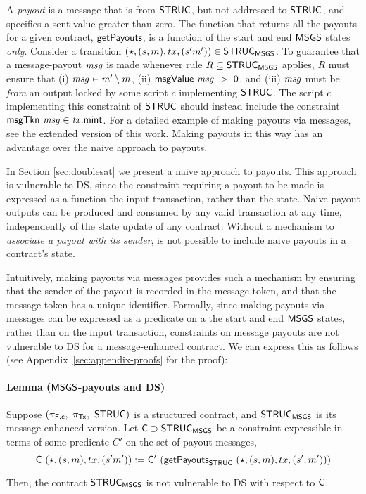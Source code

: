 A \emph{payout} is a message that is from $\mathsf{STRUC}$, but not addressed to $\mathsf{STRUC}$, and
specifies a sent value greater than zero. The function that
returns all the payouts for a given contract, $\mathsf{getPayouts}$, is a function
of the start and end $\mathsf{MSGS}$ states \emph{only}.
Consider a transition $(\star, (s, m), tx, (s' m')) \in \mathsf{STRUC}_{\mathsf{MSGS}}$.
To guarantee that a message-payout $\mathit{msg}$ is made whenever rule $R \subseteq \mathsf{STRUC}_{\mathsf{MSGS}}$
applies, $R$ must ensure that (i) $\mathit{msg} \in \mathit{m'} \setminus m$,
(ii) $\mathsf{msgValue}~\mathit{msg} ~>~ 0$, and (iii) $\mathit{msg}$ must be \emph{from} an output
locked by some script $c$ implementing $\mathsf{STRUC}$.
The script $c$ implementing this constraint of $\mathsf{STRUC}$ should
instead include the constraint $\mathsf{msgTkn}~\mathit{msg} \in \mathit{tx} . \mathsf{mint}$. For a detailed example
of making payouts via messages, see the extended version of this work.
Making payouts in this way has an advantage over the naive approach to payouts.

In Section \ref{sec:doublesat} we present a naive approach to payouts. This approach is
vulnerable to DS, since the constraint requiring a payout to be made is expressed
as a function the input transaction, rather than the state.
Naive payout outputs can be produced and consumed by any valid transaction at any time,
independently of the state update of any contract.
Without a mechanism to \emph{associate a payout with its sender}, is not possible to
include naive payouts in a contract's state.

Intuitively, making payouts via messages provides such a mechanism by ensuring that the
sender of the payout is recorded in the message token, and that the message token
has a unique identifier. Formally, since making payouts via messages can be expressed as
a predicate on a the start and end $\mathsf{MSGS}$ states, rather than on the input transaction,
constraints on message payouts are not vulnerable to DS for a message-enhanced contract.
We can express this as follows (see Appendix~\ref{sec:appendix-proofs} for the proof):

\paragraph{Lemma ($\mathsf{MSGS}$-payouts and DS)}
Suppose $(\pi_{\mathsf{F,c}},~\pi_{\mathsf{Tx}},~\mathsf{STRUC})$ is a structured contract,
and $\mathsf{STRUC}_{\mathsf{MSGS}}$ is its message-enhanced version.
Let $\mathsf{C} \supset \mathsf{STRUC}_{\mathsf{MSGS}}$ be a constraint expressible in terms of
some predicate $C'$ on the set of payout messages,
\[\mathsf{C}~(\star, (s, m), tx, (s' m')) \mathrel{\mathop:}= \mathsf{C'}~(\mathsf{getPayouts}_{\mathsf{STRUC}}~(\star, (s, m), tx, (s', m'))) \]

Then, the contract $\mathsf{STRUC}_{\mathsf{MSGS}}$ is not vulnerable to DS with respect to $\mathsf{C}$.
